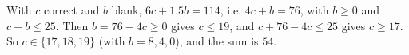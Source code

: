 With $c$ correct and $b$ blank, $6c+1.5b=114$, i.e. $4c+b=76$, with $b\ge0$ and $c+b\le25$. Then $b=76-4c\ge0$ gives $c\le19$, and $c+76-4c\le25$ gives $c\ge17$. So $c\in\{17,18,19\}$ (with $b=8,4,0$), and the sum is $\boxed{54}$.
